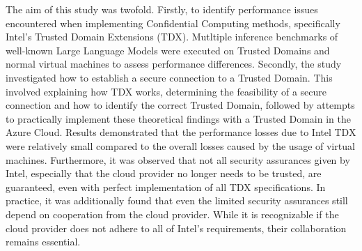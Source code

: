 
\Abstract
The aim of this study was twofold. Firstly, to identify performance issues encountered when implementing Confidential Computing methods, specifically Intel's Trusted Domain Extensions (TDX). Mutltiple inference benchmarks of well-known Large Language Models were executed on Trusted Domains and normal virtual machines to assess performance differences. Secondly, the study investigated how to establish a secure connection to a Trusted Domain. This involved explaining how TDX works, determining the feasibility of a secure connection and how to identify the correct Trusted Domain, followed by attempts to practically implement these theoretical findings with a Trusted Domain in the Azure Cloud. Results demonstrated that the performance losses due to Intel TDX were relatively small compared to the overall losses caused by the usage of virtual machines. Furthermore, it was observed that not all security assurances given by Intel, especially that the cloud provider no longer needs to be trusted, are guaranteed, even with perfect implementation of all TDX specifications. In practice, it was additionally found that even the limited security assurances still depend on cooperation from the cloud provider. While it is recognizable if the cloud provider does not adhere to all of Intel's requirements, their collaboration remains essential.